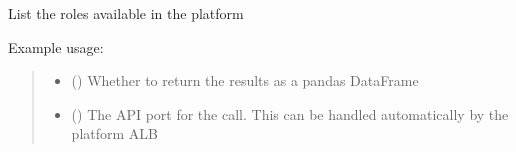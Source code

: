 \documentclass[letterpaper,10pt,english]{sphinxmanual}
\begin{document}
\begin{fulllineitems}
\begin{fulllineitems}
\label{\detokenize{aisquared.platform:aisquared.platform.AISquaredPlatformClient.AISquaredPlatformClient.list_roles}}
\pysigstartsignatures
{}
\pysigstopsignatures
\sphinxAtStartPar
List the roles available in the platform

\sphinxAtStartPar
Example usage:

\begin{sphinxVerbatim}[commandchars=\\\{\}]
 
  
\end{sphinxVerbatim}
\begin{quote}\begin{description}
\begin{itemize}
\item {} 
\sphinxAtStartPar
{} (\sphinxstyleliteralemphasis{\sphinxupquote{ (}}\sphinxstyleliteralemphasis{\sphinxupquote{)}}) \textendash{} Whether to return the results as a pandas DataFrame

\item {} 
\sphinxAtStartPar
{} (\sphinxstyleliteralemphasis{\sphinxupquote{ (}}\sphinxstyleliteralemphasis{\sphinxupquote{)}}) \textendash{} The API port for the call. This can be handled automatically by the platform ALB


\end{itemize}
\end{description}
\end{quote}
\end{fulllineitems}
\end{fulllineitems}
\end{document}
